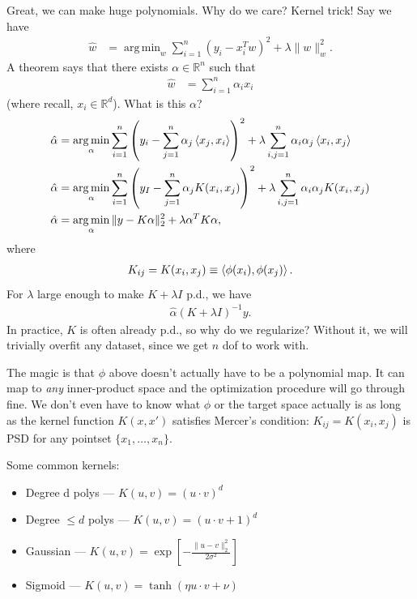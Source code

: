 \documentclass[11pt,letterpaper]{article}
\DeclareMathOperator*{\argmin}{arg\,min}
\theoremstyle{definition}
\theoremstyle{plain}
\numberwithin{equation}{section}
\numberwithin{figure}{section}
\begin{document}
Great, we can make huge polynomials. Why do we care? Kernel trick! Say we have
%
\begin{align}
	\hat{w} &= \argmin_{w} \sum_{i=1}^n \left(y_i - x_i^T w\right)^2 + \lambda \|w\|_w^2.
\end{align}
%
A theorem says that there exists $\alpha \in \mathbb{R}^n$ such that
%
\begin{align}
	\hat{w} &= \sum_{i=1}^n \alpha_i x_i
\end{align}
%
(where recall, $x_i \in \mathbb{R}^d$). What is this $\alpha$?
%
\begin{align}
	\hat{\alpha} &= \argmin_{\alpha} \sum_{i=1}^n \left(y_i - \sum_{j=1}^n \alpha_j \braket{x_j,x_i}\right)^2 + \lambda \sum_{i,j=1}^n \alpha_i \alpha_j \braket{x_i,x_j}\\
	\hat{\alpha} &= \argmin_{\alpha} \sum_{i=1}^n \left(y_I - \sum_{j=1}^n \alpha_j K(x_i,x_j)\right)^2 + \lambda \sum_{i,j=1}^n \alpha_i \alpha_j K(x_i,x_j)\\
	\hat{\alpha} &= \argmin_\alpha \|y - K\alpha\|_2^2 + \lambda \alpha^T K \alpha,
\end{align}
%
where
%
\begin{align}
	K_{ij} = K(x_i,x_j) \equiv \braket{\phi(x_i),\phi(x_j)}.
\end{align}
%
For $\lambda$ large enough to make $K+\lambda I$ p.d., we have
%
\begin{align}
	\hat{\alpha} (K+\lambda I)^{-1} y.
\end{align}
%
In practice, $K$ is often already p.d., so why do we regularize? Without it, we will trivially overfit any dataset, since we get $n$ dof to work with.

The magic is that $\phi$ above doesn't actually have to be a polynomial map. It can map to \emph{any} inner-product space and the optimization procedure will go through fine. We don't even have to know what $\phi$ or the target space actually is as long as the kernel function $K(x,x')$ satisfies Mercer's condition: $K_{ij} = K(x_i,x_j)$ is PSD for any pointset $\{x_1,\ldots,x_n\}$.


Some common kernels:
%
\begin{itemize}
	\item Degree d polys --- $K(u,v) = (u \cdot v)^d$
	\item Degree $\leq d$ polys --- $K(u,v) = (u\cdot v + 1)^d$
	\item Gaussian --- $K(u,v) = \exp\left[-\frac{\|u-v\|_2^2}{2\sigma^2}\right]$
	\item Sigmoid --- $K(u,v) = \tanh(\eta u\cdot v + \nu)$
\end{itemize}
\end{document}
